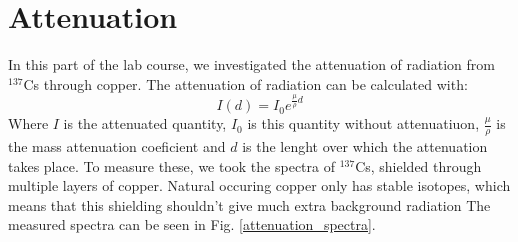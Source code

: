 \section{Attenuation}

In this part of the lab course, we investigated the attenuation of radiation from $^{137}$Cs through copper.
The attenuation of radiation can be calculated with:
\begin{equation}
I(d) = I_0 e^{\frac{\mu}{\rho} d  }
\end {equation}
Where $I$ is the attenuated quantity, $I_0$ is this quantity without attenuatiuon, $\frac{\mu}{\rho}$ is the mass attenuation coeficient and $d$ is the lenght over which the attenuation takes place.
To measure these, we took the spectra of $^{137}$Cs, shielded through multiple layers of copper.
Natural occuring copper only has stable isotopes, which means that this shielding shouldn't give much extra background radiation
The measured spectra can be seen in Fig. \ref{attenuation_spectra}.
